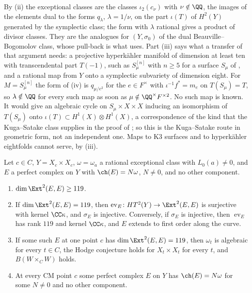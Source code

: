 \begin{remark}\label{rem:hkroute}
By (ii) the exceptional classes are the classes
$\iota_{2}(c_{\nu})$ with $\nu\notin\QQ$, the images of the elements dual to
the forms $q_{\lambda}$, $\lambda=1/\nu$, on the part $\iota(T)$ of $H^{2}(Y)$
generated by the symplectic class; the form with $\lambda$ rational gives a
product of divisor classes. They are the analogues
for $(Y,\sigma_{0})$ of the dual Beauville--Bogomolov class, whose pull-back is
what \cite{vGR26} uses. Part (iii) says what a transfer of that argument
needs: a projective hyperk\"ahler manifold of dimension at least ten with
transcendental part $T(-1)$, such as $S_{\mu}^{[n]}$ with $n\ge5$ for a
surface $S_{\mu}$ of , and a rational map from $Y$ onto a
symplectic subvariety of dimension eight. For $M=S_{\mu}^{[n]}$ the form of
(iv) is $q_{\mu/e^{2}}$ for the $e\in F^{\times}$ with $\iota^{-1}f^{*}=m_{e}$
on $T(S_{\mu})=T$, so $\lambda\notin\QQ$ for every such map as soon as
$\mu\notin\QQ^{\times}F^{\times2}$. No such map is known. It would give an
algebraic cycle on $S_{\mu}\times X\times X$ inducing an isomorphism of
$T(S_{\mu})$ onto $\iota(T)\subset H^{1}(X)\otimes H^{1}(X)$, a correspondence
of the kind that the Kuga--Satake class supplies in the proof of
; so this is the Kuga--Satake route in geometric form,
not an independent one. Maps to K3 surfaces and to hyperk\"ahler eightfolds
cannot serve, by (iii).
\end{remark}

\begin{theorem}
\label{thm:mumfordnumerical}
Let $c\in C$, $Y=X_{c}\times X_{c}$, $\omega=\omega_{a}$ a rational
exceptional class with $L_{0}(a)\ne0$, and $E$ a perfect complex on $Y$ with
$\ch(E)=N\omega$, $N\ne0$, and no other component.
\begin{enumerate}[label=\textup{(\roman*)},leftmargin=2.6em,itemsep=2pt]
\item $\dim\Ext^{2}(E,E)\ge119$.
\item If $\dim\Ext^{2}(E,E)=119$, then $\operatorname{ev}_{E}\colon
  HT^{2}(Y)\to\Ext^{2}(E,E)$ is surjective with kernel $\CC\kappa$, and
  $\sigma_{E}$ is injective. Conversely, if $\sigma_{E}$ is injective, then
  $\operatorname{ev}_{E}$ has rank $119$ and kernel $\CC\kappa$, and $E$
  extends to first order along the curve.
\item If some such $E$ at one point $c$ has $\dim\Ext^{2}(E,E)=119$, then
  $\omega_{t}$ is algebraic for every $t\in C$, the Hodge conjecture holds for
  $X_{t}\times X_{t}$ for every $t$, and $B(W\times_{C}W)$ holds.
\item At every CM point $c$ some perfect complex $E$ on $Y$ has
  $\ch(E)=N\omega$ for some $N\ne0$ and no other component.
\end{enumerate}
\end{theorem}

